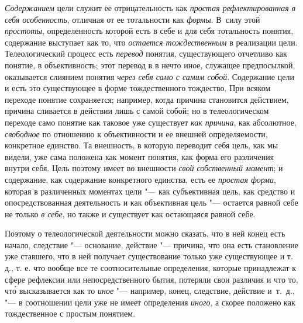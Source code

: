 {\em Содержанием} цели
служит ее отрицательность как
{\em простая рефлектированная в себя
особенность}, отличная от ее тотальности как
{\em формы}. В~силу этой
{\em простоты},
определенность которой есть в себе и для себя тотальность
понятия, содержание выступает как то, что
{\em остается тождественным}
в реализации цели. Телеологический процесс есть
{\em перевод} понятия,
существующего отчетливо как понятие, в объективность; этот перевод в
в нечто иное, служащее предпосылкой, оказывается слиянием понятия
{\em через себя само с самим собой}.
Содержание цели и есть это существующее в форме
тождественного тождество. При всяком переходе понятие сохраняется;
например, когда причина становится действием, причина сливается в действии
лишь с самой собой; но в телеологическом переходе само понятие как таковое
уже существует {\em как причина},
как абсолютное,
{\em свободное} по
отношению к объективности и ее внешней определяемости, конкретное единство.
Та внешность, в которую переводит себя цель, как мы видели, уже сама
положена как момент понятия, как форма его различения внутри себя. Цель
поэтому имеет во внешности {\em свой
собственный момент}; и содержание, как содержание
конкретного единства, есть ее
{\em простая форма},
которая в различенных моментах цели "--- как
субъективная цель, как средство и опосредствованная деятельность и как
объективная цель "--- остается равной себе не только
{\em в себе}, но также и
существует как остающаяся равной себе.

Поэтому о телеологической деятельности можно сказать, что в
ней конец есть начало, следствие "--- основание, действие
"--- причина, что она есть становление уже ставшего, что в ней
получает существование только уже существующее и т. д., т. е. что вообще
все те соотносительные определения, которые принадлежат к сфере рефлексии
или непосредственного бытия, потеряли свои различия и что то, чт\'{о}
высказывается как то
{\em иное} "--- например,
конец, следствие, действие и~т.~д., "--- в соотношении цели уже
не имеет определения
{\em иного}, а скорее
положено как тождественное с простым понятием.

